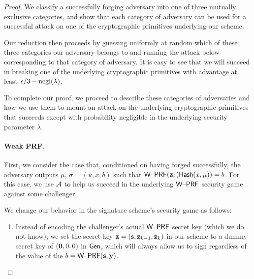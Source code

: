 \begin{proof}
We classify a successfully forging adversary into one of three
mutually exclusive categories, and show that each category of adversary can be
used for a successful attack on one of the cryptographic
primitives underlying our scheme.

Our reduction then proceeds by guessing uniformly at
random which of these three categories our adversary belongs to and
running the attack below corresponding to that category of adversary. It
is easy to see that we will succeed in breaking one of the underlying
cryptographic primitives with advantage at least $\epsilon/3-\operatorname{negl}(\lambda)$. 

To complete our proof, we proceed to describe these categories of adversaries and how we
use them to mount an attack on the underlying cryptographic primitives
that succeeds except with probability negligible in the underlying
security parameter $\lambda$.

 \paragraph{Weak PRF.} First, we consider the case that, conditioned on
 having forged successfully, the adversary outputs $\mu$,
  $\sigma=(u,x,b)$ such that $\mathsf{W\text{\textendash}PRF}(\mathbf{z},(\mathsf{Hash}(x,\mu))=b$. For this
  case, we use $\mathcal{A}$ to help us succeed in the underlying $\mathsf{W\text{\textendash}PRF}$
  security game against some challenger. 

We change our behavior in the
  signature scheme's security game as follows:
\begin{enumerate}
\item
Instead of encoding the challenger's actual $\mathsf{W\text{\textendash}PRF}$ secret key (which we do not
know), we set the secret key $\mathbf{z}=(\mathbf{s},\mathbf{z}_{k-1},\mathbf{z}_{k})$ in our scheme
  to a dummy secret key of $(\mathbf{0},0,0)$ in $\mathsf{Gen}$, which will
  always allow us to sign regardless of the value of the
  $b=\mathsf{W\text{\textendash}PRF}(\mathbf{s},\mathbf{y})$. 


\end{enumerate}
\end{proof}
